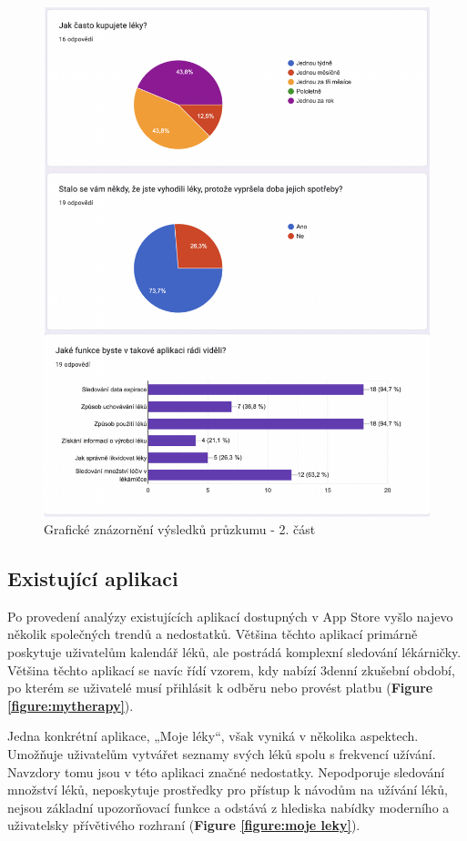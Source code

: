 \documentclass[a4paper, 11pt]{article}
\begin{document}
 \begin{figure}[!ht]
		\centering
		\includegraphics[width=1\linewidth]{Pruzkum1.pdf}
		\caption{Grafické znázornění výsledků průzkumu - 2. část}
		\label{figure:pruzkum1}
	\end{figure}
 \FloatBarrier

	\subsection{Existující aplikaci}
 Po provedení analýzy existujících aplikací dostupných v App Store vyšlo najevo několik společných trendů a nedostatků. Většina těchto aplikací primárně poskytuje uživatelům kalendář léků, ale postrádá komplexní sledování lékárničky. Většina těchto aplikací se navíc řídí vzorem, kdy nabízí 3denní zkušební období, po kterém se uživatelé musí přihlásit k odběru nebo provést platbu (\textbf {Figure \ref{figure:mytherapy}}).

 Jedna konkrétní aplikace, „Moje léky“, však vyniká v několika aspektech. Umožňuje uživatelům vytvářet seznamy svých léků spolu s frekvencí užívání. Navzdory tomu jsou v této aplikaci značné nedostatky. Nepodporuje sledování množství léků, neposkytuje prostředky pro přístup k návodům na užívání léků, nejsou základní upozorňovací funkce a odstává z hlediska nabídky moderního a uživatelsky přívětivého rozhraní (\textbf {Figure \ref{figure:moje leky}}).
\end{document}

